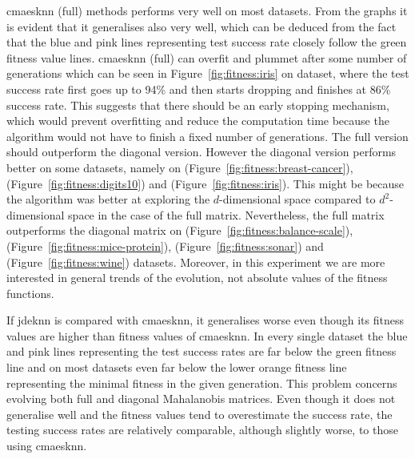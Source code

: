 \ac{cmaesknn} (full) methods performs very well on most datasets. From the graphs it is evident that it generalises also very well, which can be deduced from the fact that the blue and pink lines representing test success rate closely follow the green fitness value lines. \ac{cmaesknn} (full) can overfit and plummet after some number of generations which can be seen in Figure~\ref{fig:fitness:iris} on  dataset, where the test success rate first goes up to 94\% and then starts dropping and finishes at 86\% success rate. This suggests that there should be an early stopping mechanism, which would prevent overfitting and reduce the computation time because the algorithm would not have to finish a fixed number of generations. The full version should outperform the diagonal version. However the diagonal version performs better on some datasets, namely on  (Figure~\ref{fig:fitness:breast-cancer}),  (Figure~\ref{fig:fitness:digits10}) and  (Figure~\ref{fig:fitness:iris}). This might be because the algorithm was better at exploring the $d$-dimensional space compared to $d^2$-dimensional space in the case of the full matrix. Nevertheless, the full matrix outperforms the diagonal matrix on  (Figure~\ref{fig:fitness:balance-scale}),  (Figure~\ref{fig:fitness:mice-protein}),  (Figure~\ref{fig:fitness:sonar}) and  (Figure~\ref{fig:fitness:wine}) datasets. Moreover, in this experiment we are more interested in general trends of the evolution, not absolute values of the fitness functions.

If \ac{jdeknn} is compared with \ac{cmaesknn}, it generalises worse even though its fitness values are higher than fitness values of \ac{cmaesknn}. In every single dataset the blue and pink lines representing the test success rates are far below the green fitness line and on most datasets even far below the lower orange fitness line representing the minimal fitness in the given generation. This problem concerns evolving both full and diagonal Mahalanobis matrices. Even though it does not generalise well and the fitness values tend to overestimate the success rate, the testing success rates are relatively comparable, although slightly worse, to those using \ac{cmaesknn}.


